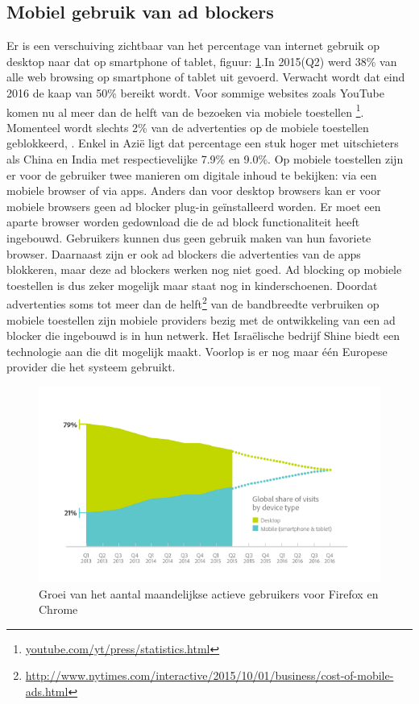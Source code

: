 \documentclass[pdftex,a4paper,12pt,twoside]{report}
\begin{document}
\subsection{Mobiel gebruik van ad blockers}
\label{sec Mobiel gebruik van ad blockers}
Er is een verschuiving zichtbaar van het percentage van internet gebruik op desktop naar dat op smartphone of tablet, figuur: \ref{fig: MobileVsDeskotpInternet}.In 2015(Q2) werd 38\% van alle web browsing op smartphone of tablet uit gevoerd. Verwacht wordt dat eind 2016 de kaap van 50\% bereikt wordt. Voor sommige websites zoals YouTube komen nu al meer dan de helft van de bezoeken via mobiele toestellen \footnote{\url{youtube.com/yt/press/statistics.html}}. Momenteel wordt slechts 2\% van de advertenties op de mobiele toestellen geblokkeerd, \cite{PageFair2015}. Enkel in Azië ligt dat percentage een stuk hoger met uitschieters als China en India met respectievelijke 7.9\% en 9.0\%. 
Op mobiele toestellen zijn er voor de gebruiker twee manieren om digitale inhoud te bekijken: via een mobiele browser of via apps. Anders dan voor desktop browsers kan er voor mobiele browsers geen ad blocker plug-in geïnstalleerd worden. Er moet een aparte browser worden gedownload die de ad block functionaliteit heeft ingebouwd. Gebruikers kunnen dus geen gebruik maken van hun favoriete browser. Daarnaast zijn er ook ad blockers die advertenties van de apps blokkeren, maar deze ad blockers werken nog niet goed. Ad blocking op mobiele toestellen is dus zeker mogelijk maar staat nog in kinderschoenen.
Doordat advertenties soms tot meer dan de helft\footnote{\url{http://www.nytimes.com/interactive/2015/10/01/business/cost-of-mobile-ads.html}} van de bandbreedte verbruiken op mobiele toestellen zijn mobiele providers bezig met de ontwikkeling van een ad blocker die ingebouwd is in hun netwerk. Het Israëlische bedrijf Shine biedt een technologie aan die dit mogelijk maakt. Voorlop is er nog maar één Europese provider die het systeem gebruikt.


\begin{figure}[h!]
\centering
\includegraphics[width=12cm]{img/MobileVsDeskotpInternet}
\caption{Groei van het aantal maandelijkse actieve gebruikers voor Firefox en Chrome}
\label{fig: MobileVsDeskotpInternet}
\end{figure}
\end{document}

